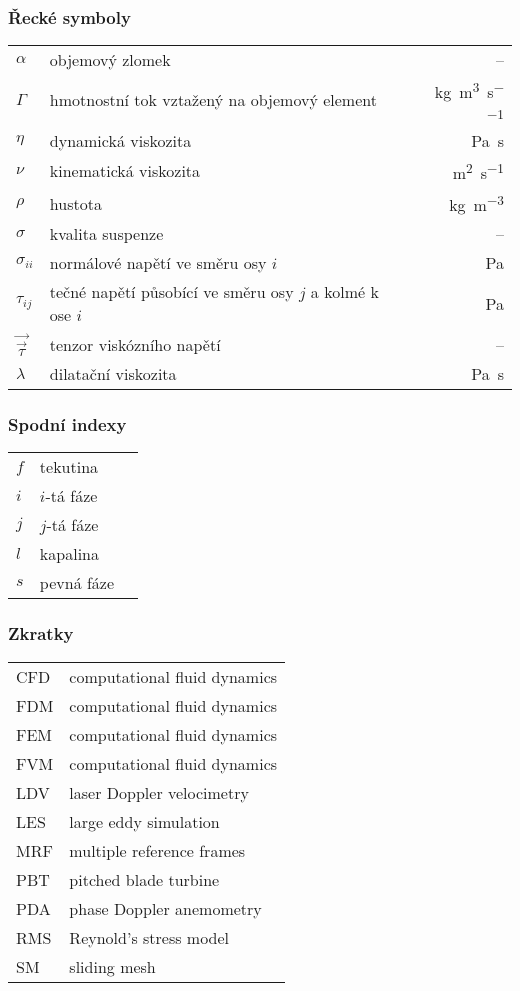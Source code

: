 \subsubsection*{Řecké symboly}
\begin{tabularx}{\textwidth}{@{}p{1.0cm} X r@{}}

$\alpha$ & objemový zlomek& --\\
$\Gamma$ & hmotnostní tok vztažený na objemový element & \si{\kilogram\per\cubic\meter\per\second} \\ 
$\eta$ & dynamická viskozita & \si{\pascal\second}\\
$\nu$ & kinematická viskozita & \si{\meter\squared\per\second}\\
$\rho$ & hustota & \si{\kilogram\per\cubic\meter} \\
$\sigma$ & kvalita suspenze & -- \\
$\sigma_{ii}$ & normálové napětí ve směru osy $i$ & \si{\pascal} \\
$\tau_{ij}$ & tečné napětí působící ve směru osy $j$ a kolmé k ose $i$ & \si{\pascal} \\
$\vec{\vec{\tau}}$ & tenzor viskózního napětí & -- \\
$\lambda$ & dilatační viskozita & \si{\pascal\second}\\

\end{tabularx}

\subsubsection*{Spodní indexy}
\begin{tabularx}{\textwidth}{@{}p{1.0cm} X r@{}}

$f$ & tekutina & \\
$i$ & $i$-tá fáze & \\
$j$ & $j$-tá fáze & \\
$l$ & kapalina & \\
$s$ & pevná fáze & \\
\end{tabularx}

\subsubsection*{Zkratky}
\begin{tabularx}{\textwidth}{@{}p{1.0cm} X }
	
CFD & computational fluid dynamics  \\
FDM & computational fluid dynamics  \\
FEM & computational fluid dynamics  \\
FVM & computational fluid dynamics  \\
LDV & laser Doppler velocimetry  \\
LES & large eddy simulation \\
MRF & multiple reference frames \\
PBT & pitched blade turbine \\
PDA & phase Doppler anemometry \\
RMS & Reynold's stress model\\
SM & sliding mesh
\end{tabularx}
